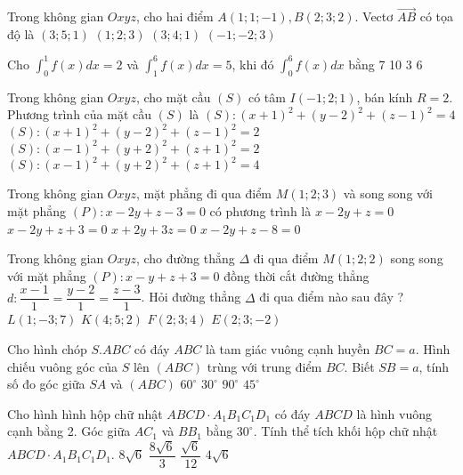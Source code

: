 \begin{ex}
 Trong không gian $O x y z$, cho hai điểm $A(1; 1;-1), B(2; 3; 2)$. Vectơ $\overrightarrow{A B}$ có tọa độ là
\choice
{$(3; 5; 1)$}
{$(1; 2; 3)$}
{$(3; 4; 1)$}
{$(-1;-2; 3)$}
\end{ex}

\begin{ex}
 Cho $\int_{0}^{1} f(x) d x=2$ và $\int_{1}^{6} f(x) d x=5$, khi đó $\int_{0}^{6} f(x) d x$ bằng
\choice
{7}
{10}
{$3$}
{6}
\end{ex}

\begin{ex}
 Trong không gian $O x y z$, cho mặt cầu $(S)$ có tâm $I(-1; 2; 1)$, bán kính $R=2$. Phương trình của mặt cầu $(S)$ là
\choice
{$(S):(x+1)^{2}+(y-2)^{2}+(z-1)^{2}=4$}
{$(S):(x+1)^{2}+(y-2)^{2}+(z-1)^{2}=2$}
{$(S):(x-1)^{2}+(y+2)^{2}+(z+1)^{2}=2$}
{$(S):(x-1)^{2}+(y+2)^{2}+(z+1)^{2}=4$}
\end{ex}

\begin{ex}
 Trong không gian $O x y z$, mặt phẳng đi qua điểm $M(1; 2; 3)$ và song song với mặt phẳng $(P): x-2 y+z-3=0$ có phương trình là
\choice
{$x-2 y+z=0$}
{$x-2 y+z+3=0$}
{$x+2 y+3 z=0$}
{$x-2 y+z-8=0$}
\end{ex}

\begin{ex}
 Trong không gian $O x y z$, cho đường thẳng $\Delta$ đi qua điểm $M(1; 2; 2)$ song song với mặt phẳng $(P): x-y+z+3=0$ đồng thời cắt đường thẳng $d: \dfrac{x-1}{1}=\dfrac{y-2}{1}=\dfrac{z-3}{1}$. Hỏi đường thẳng $\Delta$ đi qua điểm nào sau đây ?
\choice
{$L(1;-3; 7)$}
{$K(4; 5; 2)$}
{$F(2; 3; 4)$}
{$E(2; 3;-2)$}
\end{ex}

\begin{ex}
 Cho hình chóp $S. A B C$ có đáy $A B C$ là tam giác vuông cạnh huyền $B C=a$. Hình chiếu vuông góc của $S$ lên $(A BC)$ trùng với trung điểm $B C$. Biết $S B=a$, tính số đo góc giữa $S A$ và $(A BC)$
\choice
{$60^{\circ}$}
{$30^{\circ}$}
{$90^{\circ}$}
{$45^{\circ}$}
\end{ex}

\begin{ex}
 Cho hình hình hộp chữ nhật $A B C D \cdot A_{1} B_{1} C_{1} D_{1}$ có đáy $A B C D$ là hình vuông cạnh bằng 2. Góc giữa $A C_{1}$ và $B B_{1}$ bằng $30^{\circ}$. Tính thể tích khối hộp chữ nhật $A B C D \cdot A_{1} B_{1} C_{1} D_{1}$.
\choice
{$8 \sqrt{6}$}
{$\dfrac{8 \sqrt{6}}{3}$}
{$\dfrac{\sqrt{6}}{12}$}
{$4 \sqrt{6}$}
\end{ex}

